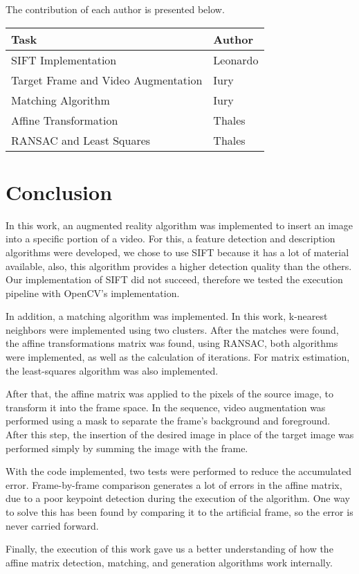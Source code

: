 \documentclass[]{IEEEtran}
\begin{document}
The contribution of each author is presented below.

\begin{table}[H]
\begin{tabular}{|l|l|}
\hline
\textbf{Task}                       & \textbf{Author} \\ \hline
SIFT Implementation                 & Leonardo      \\ \hline
Target Frame and Video Augmentation & Iury          \\ \hline
Matching Algorithm                  & Iury          \\ \hline
Affine Transformation               & Thales        \\ \hline
RANSAC and Least Squares            & Thales        \\ \hline
\end{tabular}
\end{table}

\section{Conclusion}

In this work, an augmented reality algorithm was implemented to insert an image into a specific portion of a video. For this, a feature detection and description algorithms were developed, we chose to use SIFT because it has a lot of material available, also, this algorithm provides a higher detection quality than the others. Our implementation of SIFT did not succeed, therefore we tested the execution pipeline with OpenCV's implementation.

In addition, a matching algorithm was implemented. In this work, k-nearest neighbors were implemented using two clusters. After the matches were found, the affine transformations matrix was found, using RANSAC, both algorithms were implemented, as well as the calculation of iterations. For matrix estimation, the least-squares algorithm was also implemented.

After that, the affine matrix was applied to the pixels of the source image, to transform it into the frame space. In the sequence, video augmentation was performed using a mask to separate the frame's background and foreground. After this step, the insertion of the desired image in place of the target image was performed simply by summing the image with the frame.

With the code implemented, two tests were performed to reduce the accumulated error. Frame-by-frame comparison generates a lot of errors in the affine matrix, due to a poor keypoint detection during the execution of the algorithm. One way to solve this has been found by comparing it to the artificial frame, so the error is never carried forward.

Finally, the execution of this work gave us a better understanding of how the affine matrix detection, matching, and generation algorithms work internally.
\end{document}
